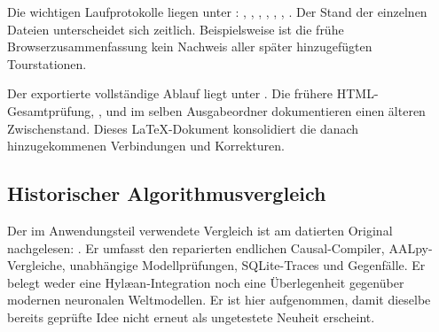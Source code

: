 Die wichtigen Laufprotokolle liegen unter :
,
,
,
,
,
,
.
Der Stand der einzelnen Dateien unterscheidet sich zeitlich. Beispielsweise ist die frühe Browserzusammenfassung kein Nachweis aller später hinzugefügten Tourstationen.

Der exportierte vollständige Ablauf liegt unter
.
Die frühere HTML-Gesamtprüfung,
,
und  im selben Ausgabeordner dokumentieren einen älteren Zwischenstand. Dieses LaTeX-Dokument konsolidiert die danach hinzugekommenen Verbindungen und Korrekturen.

\subsection{Historischer Algorithmusvergleich}
Der im Anwendungsteil verwendete Vergleich ist am datierten Original nachgelesen:
.
Er umfasst den reparierten endlichen Causal-Compiler, AALpy-Vergleiche, unabhängige Modellprüfungen, SQLite-Traces und Gegenfälle. Er belegt weder eine Hylæan-Integration noch eine Überlegenheit gegenüber modernen neuronalen Weltmodellen. Er ist hier aufgenommen, damit dieselbe bereits geprüfte Idee nicht erneut als ungetestete Neuheit erscheint.

